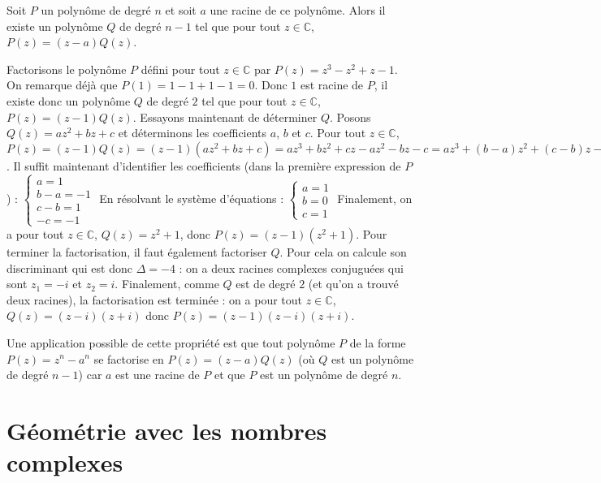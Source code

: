 	\begin{formula}
		Soit $P$ un polynôme de degré $n$ et soit $a$ une racine de ce polynôme. Alors il existe un polynôme $Q$ de degré $n-1$ tel que pour tout $z \in \mathbb{C}$, $P(z) = (z-a)Q(z)$.
	\end{formula}
	
	\begin{tip}[Exemple]
		Factorisons le polynôme $P$ défini pour tout $z \in \mathbb{C}$ par $P(z) = z^3 - z^2 + z - 1$.
		\newpar
		On remarque déjà que $P(1) = 1 - 1 + 1 - 1 = 0$. Donc $1$ est racine de $P$, il existe donc un polynôme $Q$ de degré $2$ tel que pour tout $z \in \mathbb{C}$, $P(z) = (z-1)Q(z)$.
		\newpar
		Essayons maintenant de déterminer $Q$. Posons $Q(z) = az^2 + bz + c$ et déterminons les coefficients $a$, $b$ et $c$.
		\newpar
		Pour tout $z \in \mathbb{C}$, $P(z) = (z-1)Q(z) = (z-1)(az^2 + bz + c) = az^3 + bz^2 + cz - az^2 - bz - c = az^3 + (b-a)z^2 + (c-b)z - c$.
		\newpar
		Il suffit maintenant d'identifier les coefficients (dans la première expression de $P$) :
		\newpar
		$\begin{cases} a = 1 \\ b-a = -1 \\ c-b = 1 \\ -c = -1 \end{cases}$
		\newpar
		En résolvant le système d'équations :
		\newpar
		$\begin{cases} a = 1 \\ b = 0 \\ c = 1 \end{cases}$
		\newpar
		Finalement, on a pour tout $z \in \mathbb{C}$, $Q(z) = z^2 + 1$, donc $P(z) = (z-1)(z^2 + 1)$.
		\newpar
		Pour terminer la factorisation, il faut également factoriser $Q$. Pour cela on calcule son discriminant qui est donc $\Delta = -4$ : on a deux racines complexes conjuguées qui sont $z_1 = -i$ et $z_2 = i$.
		\newpar
		Finalement, comme $Q$ est de degré $2$ (et qu'on a trouvé deux racines), la factorisation est terminée : on a pour tout $z \in \mathbb{C}$, $Q(z) = (z-i)(z+i)$ donc $P(z) = (z-1)(z-i)(z+i)$.
	\end{tip}
	
	Une application possible de cette propriété est que tout polynôme $P$ de la forme $P(z) = z^n - a^n$ se factorise en $P(z) = (z-a)Q(z)$ (où $Q$ est un polynôme de degré $n-1$) car $a$ est une racine de $P$ et que $P$ est un polynôme de degré $n$.
	
	\section{Géométrie avec les nombres complexes}
	
